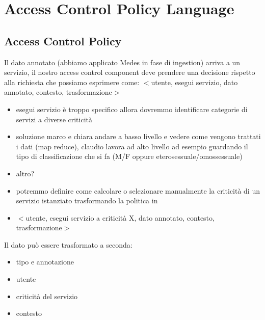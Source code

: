 \documentclass[10pt,journal,compsoc]{IEEEtran}
\begin{document}
\section{Access Control Policy Language}

\subsection{Access Control Policy}

Il dato annotato (abbiamo applicato Medes in fase di ingestion) arriva a un servizio, il nostro access control component deve prendere una decisione rispetto alla richiesta che possiamo esprimere come: $<$utente, esegui servizio, dato annotato, contesto, trasformazione$>$

\begin{itemize}
    \item esegui servizio è troppo specifico allora dovremmo identificare categorie di servizi a diverse criticità
    \item soluzione marco e chiara andare a basso livello e vedere come vengono trattati i dati (map reduce), claudio lavora ad alto livello ad esempio guardando il tipo di classificazione che si fa (M/F oppure eterosessuale/omossessuale)
    \item altro?
    \item potremmo definire come calcolare o selezionare manualmente la criticità di un servizio istanziato trasformando la politica in
    \item $<$utente, esegui servizio a criticità X, dato annotato, contesto, trasformazione$>$
\end{itemize}


Il dato può essere trasformato a seconda:
\begin{itemize}
    \item tipo e annotazione
    \item utente
    \item criticità del servizio
    \item contesto
\end{itemize}
\end{document}
